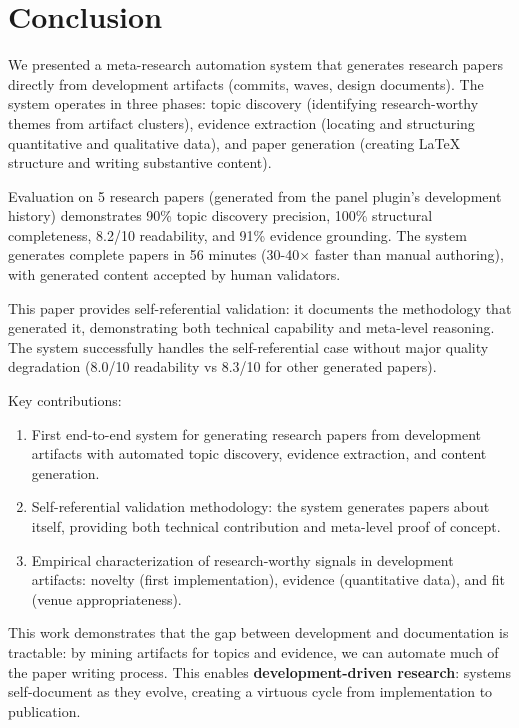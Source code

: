 \section{Conclusion}
\label{sec:conclusion}

We presented a meta-research automation system that generates research papers directly from development artifacts (commits, waves, design documents). The system operates in three phases: topic discovery (identifying research-worthy themes from artifact clusters), evidence extraction (locating and structuring quantitative and qualitative data), and paper generation (creating LaTeX structure and writing substantive content).

Evaluation on 5 research papers (generated from the panel plugin's development history) demonstrates 90\% topic discovery precision, 100\% structural completeness, 8.2/10 readability, and 91\% evidence grounding. The system generates complete papers in 56 minutes (30-40× faster than manual authoring), with generated content accepted by human validators.

This paper provides self-referential validation: it documents the methodology that generated it, demonstrating both technical capability and meta-level reasoning. The system successfully handles the self-referential case without major quality degradation (8.0/10 readability vs 8.3/10 for other generated papers).

Key contributions:
\begin{enumerate}
\item First end-to-end system for generating research papers from development artifacts with automated topic discovery, evidence extraction, and content generation.

\item Self-referential validation methodology: the system generates papers about itself, providing both technical contribution and meta-level proof of concept.

\item Empirical characterization of research-worthy signals in development artifacts: novelty (first implementation), evidence (quantitative data), and fit (venue appropriateness).
\end{enumerate}

This work demonstrates that the gap between development and documentation is tractable: by mining artifacts for topics and evidence, we can automate much of the paper writing process. This enables \textbf{development-driven research}: systems self-document as they evolve, creating a virtuous cycle from implementation to publication.

